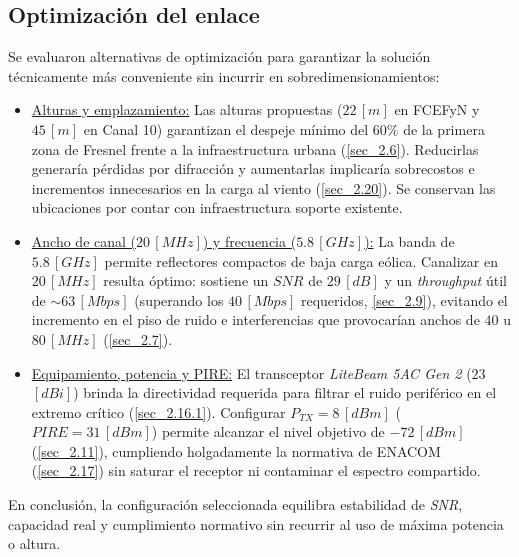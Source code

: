 \subsection{Optimización del enlace}
\label{sec_2.22}
Se evaluaron alternativas de optimización para garantizar la solución técnicamente más conveniente sin incurrir en sobredimensionamientos:
\begin{itemize}
    \item \underline{Alturas y emplazamiento:} Las alturas propuestas ($22 \, [m]$ en FCEFyN y $45 \, [m]$ en Canal 10) garantizan el despeje mínimo del $60\%$ de la primera zona de Fresnel frente a la infraestructura urbana (\autoref{sec_2.6}). Reducirlas generaría pérdidas por difracción y aumentarlas implicaría sobrecostos e incrementos innecesarios en la carga al viento (\autoref{sec_2.20}). Se conservan las ubicaciones por contar con infraestructura soporte existente.
    \item \underline{Ancho de canal ($20 \, [MHz]$) y frecuencia ($5.8 \, [GHz]$):} La banda de $5.8 \, [GHz]$ permite reflectores compactos de baja carga eólica. Canalizar en $20 \, [MHz]$ resulta óptimo: sostiene un $SNR$ de $29 \, [dB]$ y un \textit{throughput} útil de $\sim 63 \, [Mbps]$ (superando los $40 \, [Mbps]$ requeridos, \autoref{sec_2.9}), evitando el incremento en el piso de ruido e interferencias que provocarían anchos de $40$ u $80 \, [MHz]$ (\autoref{sec_2.7}).
    \item \underline{Equipamiento, potencia y PIRE:} El transceptor \textit{LiteBeam 5AC Gen 2} ($23 \,$ $[dBi]$) brinda la directividad requerida para filtrar el ruido periférico en el extremo crítico (\autoref{sec_2.16.1}). Configurar $P_{TX} = 8 \, [dBm]$ ($PIRE = 31 \, [dBm]$) permite alcanzar el nivel objetivo de $-72 \, [dBm]$ (\autoref{sec_2.11}), cumpliendo holgadamente la normativa de ENACOM (\autoref{sec_2.17}) sin saturar el receptor ni contaminar el espectro compartido.
\end{itemize}

En conclusión, la configuración seleccionada equilibra estabilidad de \textit{SNR}, capacidad real y cumplimiento normativo sin recurrir al uso de máxima potencia o altura.
